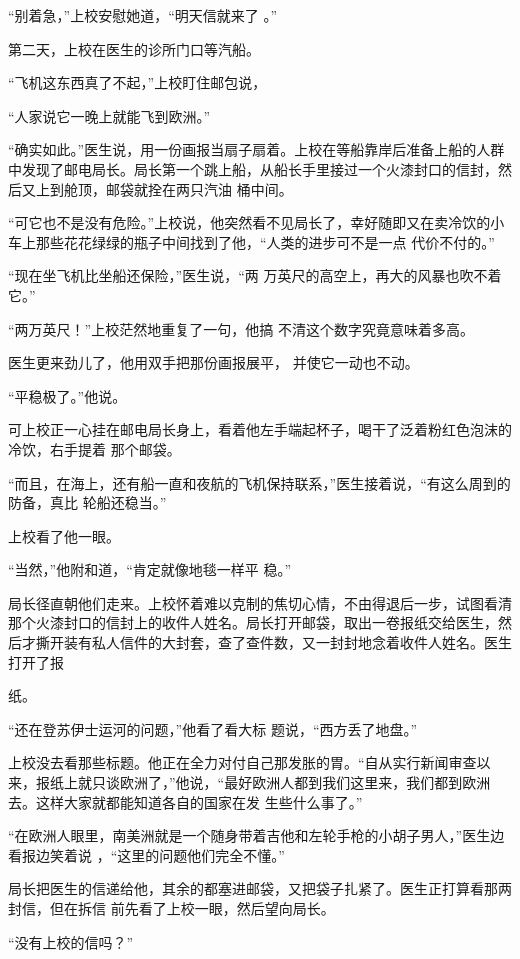 \documentclass{article}
\begin{document}
“别着急，”上校安慰她道，“明天信就来了
。” 


第二天，上校在医生的诊所门口等汽船。 

“飞机这东西真了不起，”上校盯住邮包说，

\newpage
“人家说它一晚上就能飞到欧洲。” 

“确实如此。”医生说，用一份画报当扇子扇着。上校在等船靠岸后准备上船的人群中发现了邮电局长。局长第一个跳上船，从船长手里接过一个火漆封口的信封，然后又上到舱顶，邮袋就拴在两只汽油
桶中间。 

“可它也不是没有危险。”上校说，他突然看不见局长了，幸好随即又在卖冷饮的小车上那些花花绿绿的瓶子中间找到了他，“人类的进步可不是一点
代价不付的。” 

“现在坐飞机比坐船还保险，”医生说，“两
万英尺的高空上，再大的风暴也吹不着它。” 

“两万英尺！”上校茫然地重复了一句，他搞
不清这个数字究竟意味着多高。 

医生更来劲儿了，他用双手把那份画报展平，
并使它一动也不动。 

\newpage


“平稳极了。”他说。 

可上校正一心挂在邮电局长身上，看着他左手端起杯子，喝干了泛着粉红色泡沫的冷饮，右手提着
那个邮袋。 

“而且，在海上，还有船一直和夜航的飞机保持联系，”医生接着说，“有这么周到的防备，真比
轮船还稳当。” 


上校看了他一眼。 

“当然，”他附和道，“肯定就像地毯一样平
稳。” 

局长径直朝他们走来。上校怀着难以克制的焦切心情，不由得退后一步，试图看清那个火漆封口的信封上的收件人姓名。局长打开邮袋，取出一卷报纸交给医生，然后才撕开装有私人信件的大封套，查了查件数，又一封封地念着收件人姓名。医生打开了报

\newpage
纸。 

“还在登苏伊士运河的问题，”他看了看大标
题说，“西方丢了地盘。” 

上校没去看那些标题。他正在全力对付自己那发胀的胃。“自从实行新闻审查以来，报纸上就只谈欧洲了，”他说，“最好欧洲人都到我们这里来，我们都到欧洲去。这样大家就都能知道各自的国家在发
生些什么事了。” 

“在欧洲人眼里，南美洲就是一个随身带着吉他和左轮手枪的小胡子男人，”医生边看报边笑着说
，“这里的问题他们完全不懂。” 

局长把医生的信递给他，其余的都塞进邮袋，又把袋子扎紧了。医生正打算看那两封信，但在拆信
前先看了上校一眼，然后望向局长。 


“没有上校的信吗？” 
\end{document}
